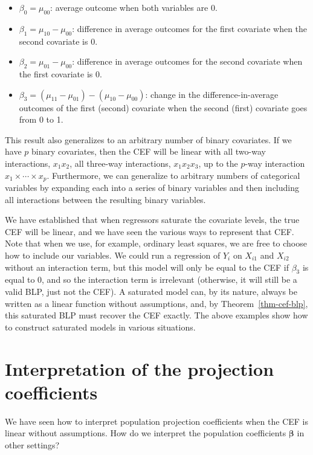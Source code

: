 \documentclass[
  13pt,
  letterpaper,
  DIV=11,
  numbers=noendperiod]{scrreprt}
\providecommand{\tightlist}{%
  \setlength{\itemsep}{0pt}\setlength{\parskip}{0pt}}
\newcommand{\mb}{\bm}
\newcommand{\bfbeta}{\mb{\beta}}
\theoremstyle{plain}
\theoremstyle{plain}
\theoremstyle{definition}
\theoremstyle{definition}
\theoremstyle{remark}
\begin{document}
\begin{itemize}
\tightlist
\item
  \(\beta_0 = \mu_{00}\): average outcome when both variables are 0.
\item
  \(\beta_1 = \mu_{10} - \mu_{00}\): difference in average outcomes for
  the first covariate when the second covariate is 0.
\item
  \(\beta_2 = \mu_{01} - \mu_{00}\): difference in average outcomes for
  the second covariate when the first covariate is 0.
\item
  \(\beta_3 = (\mu_{11} - \mu_{01}) - (\mu_{10} - \mu_{00})\): change in
  the difference-in-average outcomes of the first (second) covariate
  when the second (first) covariate goes from 0 to 1.
\end{itemize}

This result also generalizes to an arbitrary number of binary
covariates. If we have \(p\) binary covariates, then the CEF will be
linear with all two-way interactions, \(x_1x_2\), all three-way
interactions, \(x_1x_2x_3\), up to the \(p\)-way interaction
\(x_1\times\cdots\times x_p\). Furthermore, we can generalize to
arbitrary numbers of categorical variables by expanding each into a
series of binary variables and then including all interactions between
the resulting binary variables.

We have established that when regressors saturate the covariate levels,
the true CEF will be linear, and we have seen the various ways to
represent that CEF. Note that when we use, for example, ordinary least
squares, we are free to choose how to include our variables. We could
run a regression of \(Y_i\) on \(X_{i1}\) and \(X_{i2}\) without an
interaction term, but this model will only be equal to the CEF if
\(\beta_3\) is equal to 0, and so the interaction term is irrelevant
(otherwise, it will still be a valid BLP, just not the CEF). A saturated
model can, by its nature, always be written as a linear function without
assumptions, and, by Theorem~\ref{thm-cef-blp}, this saturated BLP must
recover the CEF exactly. The above examples show how to construct
saturated models in various situations.

\section{Interpretation of the projection
coefficients}\label{interpretation-of-the-projection-coefficients}

We have seen how to interpret population projection coefficients when
the CEF is linear without assumptions. How do we interpret the
population coefficients \(\bfbeta\) in other settings?
\end{document}
